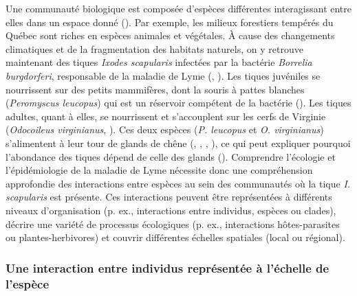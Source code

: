 Une communauté biologique est composée d'espèces différentes interagissant entre
elles dans un espace donné (\cite{Stroud2015Community}). Par exemple, les
milieux forestiers tempérés du Québec sont riches en espèces animales et
végétales. À cause des changements climatiques et de la fragmentation des
habitats naturels, on y retrouve maintenant des tiques \textit{Ixodes
scapularis} infectées par la bactérie \textit{Borrelia burgdorferi}, responsable
de la maladie de Lyme (\cite{Ogden2009Emergence}, \cite{Simon2014Climate}). Les
tiques juvéniles se nourrissent sur des petits mammifères, dont la souris à
pattes blanches (\textit{Peromyscus leucopus}) qui est un réservoir compétent de
la bactérie (\cite{Donahue1987Reservoir}). Les tiques adultes, quant à elles, se
nourrissent et s'accouplent sur les cerfs de Virginie (\textit{Odocoileus
virginianus}, \cite{Lane1991Lyme}). Ces deux espèces (\textit{P. leucopus} et
\textit{O. virginianus}) s'alimentent à leur tour de glands de chêne
(\cite{McShea1993Variablea}, \cite{Elkinton1996Interactions},
\cite{Wolff1996Population}, \cite{McShea2000Influence}), ce qui peut expliquer
pourquoi l'abondance des tiques dépend de celle des glands
(\cite{Ostfeld2006Climate}). Comprendre l'écologie et l'épidémiologie de la
maladie de Lyme nécessite donc une compréhension approfondie des interactions
entre espèces au sein des communautés où la tique \textit{I. scapularis} est
présente. Ces interactions peuvent être représentées 
à différents niveaux d'organisation (p. ex., interactions entre individus, espèces ou clades), 
décrire une variété de processus écologiques (p. ex., interactions hôtes-parasites ou
plantes-herbivores) et couvrir différentes échelles spatiales (local ou régional).

\subsubsection{Une interaction entre individus représentée à l'échelle de l'espèce} 

